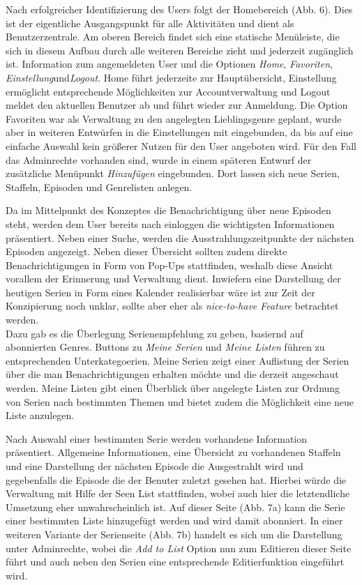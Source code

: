Nach erfolgreicher Identifizierung des Users folgt der Homebereich (Abb. 6). Dies ist der eigentliche Ausgangspunkt für alle Aktivitäten und dient als Benutzerzentrale. Am oberen Bereich findet sich eine statische Menüleiste, die sich in diesem Aufbau durch alle weiteren Bereiche zieht und jederzeit zugänglich ist. Information zum angemeldeten User und die Optionen \textit{Home}, \textit{Favoriten}, \textit{Einstellung}und\textit {Logout}. Home führt jederzeite zur Hauptübersicht, Einstellung ermöglicht entsprechende Möglichkeiten zur Accountverwaltung und Logout meldet den aktuellen Benutzer ab und führt wieder zur Anmeldung. Die Option Favoriten war als Verwaltung zu den angelegten Lieblingsgenre geplant, wurde aber in weiteren Entwürfen in die Einstellungen mit eingebunden, da bis auf eine einfache Auswahl kein größerer Nutzen für den User angeboten wird. Für den Fall das Adminrechte vorhanden sind, wurde in einem späteren Entwurf der zusätzliche Menüpunkt \textit{Hinzufügen} eingebunden. Dort lassen sich neue Serien, Staffeln, Episoden und Genrelisten anlegen. \\


\newpage

Da im Mittelpunkt des Konzeptes die Benachrichtigung über neue Episoden steht, werden dem User bereits nach einloggen die wichtigsten Informationen präsentiert. Neben einer Suche, werden die Ausstrahlungszeitpunkte der nächsten Episoden angezeigt. Neben dieser Übersicht sollten zudem direkte Benachrichtigungen in Form von Pop-Ups stattfinden, weshalb diese Ansicht vorallem der Erinnerung und Verwaltung dient. Inwiefern eine Darstellung der heutigen Serien in Form eines Kalender realisierbar wäre ist zur Zeit der Konzipierung noch unklar, sollte aber eher als \textit{nice-to-have Feature} betrachtet werden.\\
Dazu gab es die Überlegung Serienempfehlung zu geben, basiernd auf abonnierten Genres. Buttons zu \textit{Meine Serien} und \textit{Meine Listen} führen zu entsprechenden Unterkategoerien.
Meine Serien zeigt einer Auflistung der Serien über die man Benachrichtigungen erhalten möchte und die derzeit angeschaut werden. Meine Listen gibt einen Überblick über angelegte Listen zur Ordnung von Serien nach bestimmten Themen und bietet zudem die Möglichkeit eine neue Liste anzulegen. \\

\parskip 12pt
\parindent 0pt

Nach Auswahl einer bestimmten Serie werden vorhandene Information präsentiert. Allgemeine Informationen, eine Übersicht zu vorhandenen Staffeln und eine Darstellung der nächsten Episode die Ausgestrahlt wird und gegebenfalls die Episode die der Benuter zuletzt gesehen hat. Hierbei würde die Verwaltung mit Hilfe der Seen List stattfinden, wobei auch hier die letztendliche Umsetzung eher unwahrscheinlich ist.
Auf dieser Seite (Abb. 7a) kann die Serie einer bestimmten Liste hinzugefügt werden und wird damit abonniert. In einer weiteren Variante der Serienseite (Abb. 7b) handelt es sich um die Darstellung unter Adminrechte, wobei die \textit{Add to List} Option nun zum Editieren dieser Seite führt und auch neben den Serien eine entsprechende Editierfunktion eingeführt wird.

